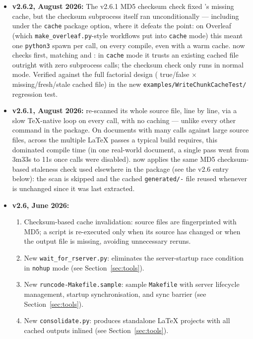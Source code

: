 \documentclass{ltxdoc}
\newcommand{\opt}[1]{\texttt{#1}}
\newcommand{\file}[1]{\texttt{#1}}
\begin{document}
\begin{itemize}

\item \textbf{v2.6.2, August 2026:}
  The v2.6.1 MD5 checksum check fixed 's missing cache,
  but the checksum subprocess itself ran unconditionally --- including
  under the \opt{cache} package option, where it defeats the point: on
  Overleaf (which \file{make\_overleaf.py}-style workflows put into
  \opt{cache} mode) this meant one \texttt{python3} spawn per
   call, on every compile, even with a warm cache.
   now checks  first, matching
   and : in \opt{cache} mode it trusts an
  existing cached file outright with zero subprocess calls; the
  checksum check only runs in normal mode. Verified against the full
  factorial design ( true/false $\times$
  missing/fresh/stale cached file) in the new
  \file{examples/WriteChunkCacheTest/} regression test.

\item \textbf{v2.6.1, August 2026:}
   re-scanned its whole source file, line by line, via a
  slow \TeX-native loop on every call, with no caching --- unlike every
  other command in the package. On documents with many 
  calls against large source files, across the multiple \LaTeX{} passes
  a typical build requires, this dominated compile time (in one
  real-world document, a single pass went from 3m33s to 11s once
   calls were disabled).  now applies the
  same MD5 checksum-based staleness check used elsewhere in the package
  (see the v2.6 entry below): the scan is skipped and the cached
  \file{generated/}\texttt{-} file reused whenever
   is unchanged since it was last extracted.

\item \textbf{v2.6, June 2026:}
  \begin{enumerate}
    \item Checksum-based cache invalidation: source files are
      fingerprinted with MD5; a script is re-executed only when its
      source has changed or when the output file is missing, avoiding
      unnecessary reruns.
    \item New \file{wait\_for\_rserver.py}: eliminates the server-startup
      race condition in \opt{nohup} mode (see Section~\ref{sec:tools}).
    \item New \file{runcode-Makefile.sample}: sample \file{Makefile}
      with server lifecycle management, startup synchronisation, and
      sync barrier (see Section~\ref{sec:tools}).
    \item New \file{consolidate.py}: produces standalone \LaTeX{}
      projects with all cached outputs inlined
      (see Section~\ref{sec:tools}).
  \end{enumerate}


\end{itemize}
\end{document}

